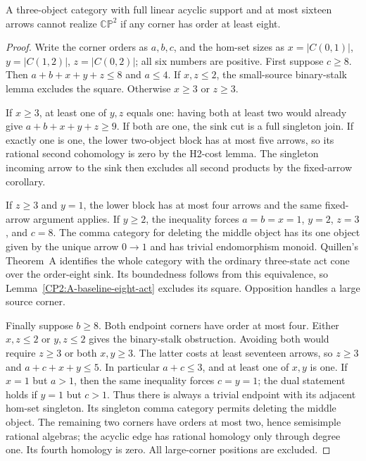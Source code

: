 \begin{proposition}
\label{CP2:A-baseline-linear-large}
A three-object category with full linear acyclic support and
at most sixteen arrows cannot realize $\mathbb{CP}^2$ if any
corner has order at least eight.
\end{proposition}
\begin{proof}
Write the corner orders as $a,b,c$, and the hom-set sizes as
$x=|C(0,1)|$, $y=|C(1,2)|$, $z=|C(0,2)|$; all six
numbers are positive.  First suppose $c\geq8$.  Then
$a+b+x+y+z\leq8$ and $a\leq4$.  If $x,z\leq2$,
the small-source binary-stalk lemma excludes the square.
Otherwise $x\geq3$ or $z\geq3$.

If $x\geq3$, at least one of $y,z$ equals one: having
both at least two would already give
$a+b+x+y+z\geq9$.  If both are one, the sink cut is
a full singleton join.  If exactly one is one, the lower
two-object block has at most five arrows, so its rational
second cohomology is zero by the H2-cost lemma.  The
singleton incoming arrow to the sink then excludes all
second products by the fixed-arrow corollary.

If $z\geq3$ and $y=1$, the lower block has at most four
arrows and the same fixed-arrow argument applies.  If
$y\geq2$, the inequality forces
$a=b=x=1$, $y=2$, $z=3$, and $c=8$.  The comma category
for deleting the middle object has its one object given
by the unique arrow $0\to1$ and has trivial endomorphism
monoid.  Quillen's Theorem~A identifies the whole category
with the ordinary three-state act cone over the order-eight
sink.  Its boundedness follows from this equivalence, so
Lemma~\ref{CP2:A-baseline-eight-act} excludes its square.
Opposition handles a large source corner.

Finally suppose $b\geq8$.  Both endpoint corners have
order at most four.  Either $x,z\leq2$ or $y,z\leq2$
gives the binary-stalk obstruction.  Avoiding both would
require $z\geq3$ or both $x,y\geq3$.  The latter costs
at least seventeen arrows, so $z\geq3$ and
$a+c+x+y\leq5$.  In particular $a+c\leq3$, and at
least one of $x,y$ is one.  If $x=1$ but $a>1$,
then the same inequality forces $c=y=1$; the dual
statement holds if $y=1$ but $c>1$.  Thus there is
always a trivial endpoint with its adjacent hom-set
singleton.  Its singleton comma category permits
deleting the middle object.  The remaining two corners
have orders at most two, hence semisimple rational
algebras; the acyclic edge has rational homology only
through degree one.  Its fourth homology is zero.
All large-corner positions are excluded.
\end{proof}

